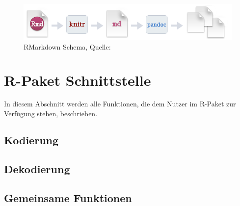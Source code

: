 \begin{figure}[ht]
\centering
\includegraphics[width=\ScaleIfNeeded]{pictures/RMarkdown}
\caption{RMarkdown Schema, Quelle: \cite{rmarkdown}}
\label{pic:RMarkdown}
\end{figure}




\section{R-Paket Schnittstelle}
\label{section:interface}

In diesem Abschnitt werden alle Funktionen, die dem Nutzer im R-Paket zur Verfügung stehen, beschrieben.

\subsection{Kodierung}

\label{sec:interface_genHamming}


\label{sec:interface_genBCH}


\clearpage
\label{sec:interface_encode}


\subsection{Dekodierung}

\label{sec:interface_decode}


\label{sec:interface_simulation}



\subsection{Gemeinsame Funktionen}
\label{sec:interface_applynoise}


\label{sec:interface_channelsimulation}


\label{sec:interface_plotdata}




